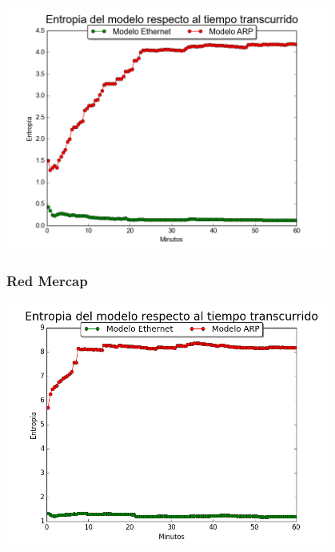\centerline{\includegraphics[width=0.8\textwidth]{./graficos/entrophyVSTime/laburo_mari.png}}


\subsubsection{Red Mercap}


\centerline{\includegraphics[width=0.8\textwidth]{./graficos/entrophyVSTime/laburo_eze.png}}